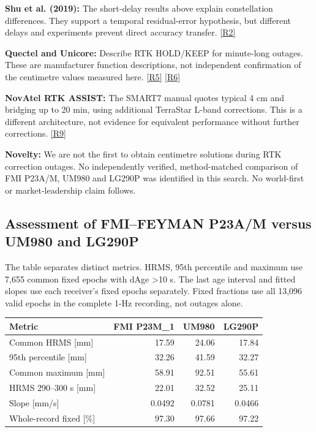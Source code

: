 \documentclass[11pt,a4paper]{article}
\numberwithin{equation}{section}
\numberwithin{figure}{section}
\begin{document}
\textbf{Shu et al. (2019):} The short-delay results above explain constellation differences. They support a temporal residual-error hypothesis, but different delays and experiments prevent direct accuracy transfer. \hyperlink{ref-R2}{[R2]}

\textbf{Quectel and Unicore:} Describe RTK HOLD/\allowbreak{}KEEP for minute-long outages. These are manufacturer function descriptions, not independent confirmation of the centimetre values measured here. \hyperlink{ref-R5}{[R5]} \hyperlink{ref-R6}{[R6]}

\textbf{NovAtel RTK ASSIST:} The SMART7 manual quotes typical 4 cm and bridging up to 20 min, using additional TerraStar L-band corrections. This is a different architecture, not evidence for equivalent performance without further corrections. \hyperlink{ref-R9}{[R9]}

\textbf{Novelty:} We are not the first to obtain centimetre solutions during RTK correction outages. No independently verified, method-matched comparison of FMI P23A/\allowbreak{}M, UM980 and LG290P was identified in this search. No world-first or market-leadership claim follows.

\subsection{Assessment of FMI–FEYMAN P23A/\allowbreak{}M versus UM980 and LG290P}

The table separates distinct metrics. HRMS, 95th percentile and maximum use 7,655 common fixed epochs with dAge >10 s. The last age interval and fitted slopes use each receiver's fixed epochs separately. Fixed fractions use all 13,096 valid epochs in the complete 1-Hz recording, not outages alone.

\begin{center}\begin{lrbox}{\reporttable}\small\setlength{\tabcolsep}{4pt}\begin{tabular}{lrrr}\toprule
Metric & FMI P23M\_1 & UM980 & LG290P\\\midrule
Common HRMS [mm] & 17.59 & 24.06 & 17.84\\
95th percentile [mm] & 32.26 & 41.59 & 32.27\\
Common maximum [mm] & 58.91 & 92.51 & 55.61\\
HRMS 290–300 s [mm] & 22.01 & 32.52 & 25.11\\
Slope [mm/\allowbreak{}s] & 0.0492 & 0.0781 & 0.0466\\
Whole-record fixed [\%] & 97.30 & 97.66 & 97.22\\
\bottomrule\end{tabular}\end{lrbox}\ifdim\wd\reporttable>\linewidth\resizebox{\linewidth}{!}{\usebox{\reporttable}}\else\usebox{\reporttable}\fi\end{center}
\end{document}
